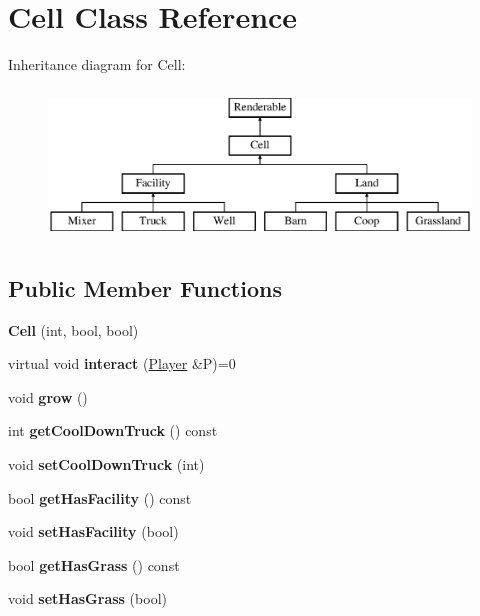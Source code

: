 \hypertarget{class_cell}{}\section{Cell Class Reference}
\label{class_cell}
Inheritance diagram for Cell\+:\begin{figure}[H]
\begin{center}
\leavevmode
\includegraphics[height=4.000000cm]{class_cell}
\end{center}
\end{figure}
\subsection*{Public Member Functions}
\begin{DoxyCompactItemize}
\item 
\mbox{\label{class_cell_a3f9499be93a51592277a4cc62935ac41}} 
{\bfseries Cell} (int, bool, bool)
\item 
\mbox{\label{class_cell_aa16137b7f051c6dbc4bae83651e566c8}} 
virtual void {\bfseries interact} (\mbox{\hyperlink{class_player}{Player}} \&P)=0
\item 
\mbox{\label{class_cell_ab6bd7f823145835ab4444c70a87c7f77}} 
void {\bfseries grow} ()
\item 
\mbox{\label{class_cell_a50808572feff9d4d4055f620b940575b}} 
int {\bfseries get\+Cool\+Down\+Truck} () const
\item 
\mbox{\label{class_cell_ae689acf3461b91a14bddb6bb727fce7c}} 
void {\bfseries set\+Cool\+Down\+Truck} (int)
\item 
\mbox{\label{class_cell_ac6b364963e015f8e85eb6275187c99db}} 
bool {\bfseries get\+Has\+Facility} () const
\item 
\mbox{\label{class_cell_acb06da58e30e96d1758fc6d9b7bcbef4}} 
void {\bfseries set\+Has\+Facility} (bool)
\item 
\mbox{\label{class_cell_a11d0adc12adfd537897c4b539c4f1183}} 
bool {\bfseries get\+Has\+Grass} () const
\item 
\mbox{\label{class_cell_a22fc890271b8cc6df750bcf777d597ac}} 
void {\bfseries set\+Has\+Grass} (bool)
\end{DoxyCompactItemize}
